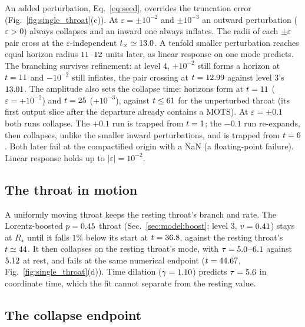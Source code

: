 \documentclass[twocolumn,floatfix,aps,prd,superscriptaddress,nofootinbib,showkeys]{revtex4-2}
\begin{document}
An added perturbation, Eq.~\eqref{eq:seed}, overrides the truncation error (Fig.~\ref{fig:single_throat}(c)). At $\varepsilon=\pm10^{-2}$ and $\pm10^{-3}$ an outward perturbation ($\varepsilon>0$) always collapses and an inward one always inflates. The radii of each $\pm\varepsilon$ pair cross at the $\varepsilon$-independent $t_\times\simeq13.0$. A tenfold smaller perturbation reaches equal horizon radius $11$--$12$ units later, as linear response on one mode predicts. The branching survives refinement: at level 4, $+10^{-2}$ still forms a horizon at $t=11$ and $-10^{-2}$ still inflates, the pair crossing at $t=12.99$ against level 3's $13.01$. The amplitude also sets the collapse time: horizons form at $t=11$ ($\varepsilon=+10^{-2}$) and $t=25$ ($+10^{-3}$), against $t\le61$ for the unperturbed throat (its first output slice after the departure already contains a MOTS). At $\varepsilon=\pm0.1$ both runs collapse. The $+0.1$ run is trapped from $t=1$; the $-0.1$ run re-expands, then collapses, unlike the smaller inward perturbations, and is trapped from $t=6$. Both later fail at the compactified origin with a NaN (a floating-point failure). Linear response holds up to $|\varepsilon|=10^{-2}$.

\subsection{The throat in motion}
\label{sec:single:moving}

A uniformly moving throat keeps the resting throat's branch and rate. The Lorentz-boosted $p=0.45$ throat (Sec.~\ref{sec:model:boost}; level 3, $v=0.41$) stays at $R_\star$ until it falls $1\%$ below its start at $t=36.8$, against the resting throat's $t\simeq44$. It then collapses on the resting throat's mode, with $\tau=5.0$--$6.1$ against $5.12$ at rest, and fails at the same numerical endpoint ($t=44.67$, Fig.~\ref{fig:single_throat}(d)). Time dilation ($\gamma=1.10$) predicts $\tau=5.6$ in coordinate time, which the fit cannot separate from the resting value.

\subsection{The collapse endpoint}
\label{sec:single:collapse}
\end{document}
